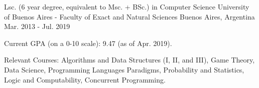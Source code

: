 

\begin{cventries}

  \cventry
    {Lsc. (6 year degree, equivalent to Msc. + BSc.) in Computer Science}
    {University of Buenos Aires - Faculty of Exact and Natural Sciences}
    {Buenos Aires, Argentina}
    {Mar. 2013 - Jul. 2019}
    {
      \begin{cvitems}
        \item Current GPA (on a 0-10 scale): 9.47 (as of Apr. 2019).
        \item Relevant Courses: Algorithms and Data Structures (I, II, and III), Game Theory, Data Science, Programming Languages Paradigms, Probability and Statistics, Logic and Computability, Concurrent Programming.
      \end{cvitems}
    }  

\end{cventries}
